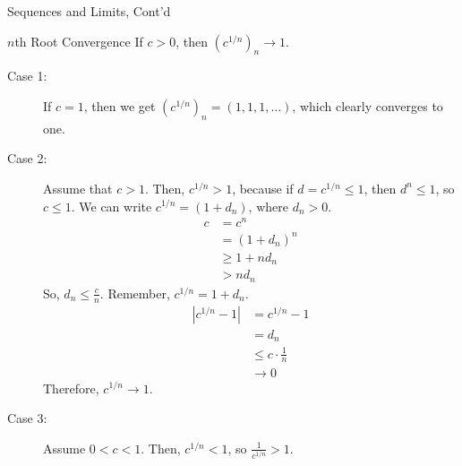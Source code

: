 \documentclass[8pt]{extarticle}
\begin{document}
  \begin{problem}{Sequences and Limits, Cont'd}
    \begin{problem}{$n$th Root Convergence}
      If $c > 0$, then $\left(c^{1/n}\right)_n \rightarrow 1$.
      \tcblower
      \begin{description}
        \item[Case 1:] If $c = 1$, then we get $\left(c^{1/n}\right)_n = (1,1,1,\dots)$, which clearly converges to one.
        \item[Case 2:] Assume that $c > 1$. Then, $c^{1/n} > 1$, because if $d = c^{1/n} \leq 1$, then $d^n \leq 1$, so $c \leq 1$. We can write $c^{1/n} = (1 + d_n)$, where $d_n > 0$.
          \begin{align*}
            c &= c^n\\
              &= (1+d_n)^n\\
              &\geq 1 + nd_n \tag*{Bernoulli's Inequality}\\
              &> nd_n
          \end{align*}
          So, $d_n \leq \frac{c}{n}$. Remember, $c^{1/n} = 1 + d_n$.
          \begin{align*}
            |c^{1/n} - 1| &= c^{1/n} - 1\\
                          &= d_n\\
                          &\leq c \cdot \frac{1}{n}\\
                          &\rightarrow 0
          \end{align*}
          Therefore, $c^{1/n} \rightarrow 1$.\newline
        \item[Case 3:] Assume $0 < c < 1$. Then, $c^{1/n} <1$, so $\frac{1}{c^{1/n}} > 1$.\newline


\end{description}
\end{problem}
\end{problem}
\end{document}
